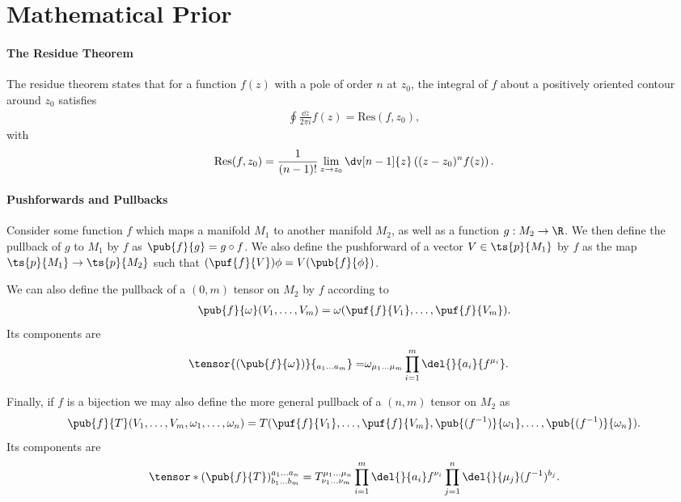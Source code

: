 \section{Mathematical Prior}

\paragraph{The Residue Theorem}
The residue theorem states that for a function $f(z)$ with a pole of order $n$ at $z_{0}$, the integral of $f$ about a positively oriented contour around $z_{0}$ satisfies
\begin{align*}
	\oint\frac{\dd{z}}{2\pi i}f(z) = \text{Res}(f, z_{0}),
\end{align*}
with
\begin{align*}
	\text{Res}(f, z_{0}) = \frac{1}{(n - 1)!}\lim\limits_{z\to z_{0}}\dv[n - 1]{z}\left((z - z_{0})^{n}f(z)\right).
\end{align*}

\paragraph{Pushforwards and Pullbacks}
Consider some function $f$ which maps a manifold $M_{1}$ to another manifold $M_{2}$, as well as a function $g: M_{2}\to\R$. We then define the pullback of $g$ to $M_{1}$ by $f$ as $\pub{f}{g} = g\circ f$. We also define the pushforward of a vector $V\in\ts{p}{M_{1}}$ by $f$ as the map $\ts{p}{M_{1}}\to\ts{p}{M_{2}}$ such that $(\puf{f}{V})\phi = V(\pub{f}{\phi})$.

We can also define the pullback of a $(0, m)$ tensor on $M_{2}$ by $f$ according to
\begin{align*}
	\pub{f}{\omega}(V_{1}, \dots, V_{m}) = \omega(\puf{f}{V_{1}}, \dots, \puf{f}{V_{m}}).
\end{align*}
Its components are
\begin{align*}
	\tensor{(\pub{f}{\omega})}{_{a_{1}\dots a_{m}}} =& \omega_{\mu_{1}\dots\mu_{m}}\prod\limits_{i = 1}^{m}\del{}{a_{i}}{f^{\mu_{i}}}.
\end{align*}

Finally, if $f$ is a bijection we may also define the more general pullback of a $(n, m)$ tensor on $M_{2}$ as
\begin{align*}
	\pub{f}{T}(V_{1}, \dots, V_{m}, \omega_{1}, \dots, \omega_{n}) = T(\puf{f}{V_{1}}, \dots, \puf{f}{V_{m}}, \pub{(f^{-1})}{\omega_{1}}, \dots, \pub{(f^{-1})}{\omega_{n}}).
\end{align*}
Its components are
\begin{align*}
	\tensor*{(\pub{f}{T})}{^{a_{1}\dots a_{n}}_{b_{1}\dots b_{m}}} = T^{\mu_{1}\dots \mu_{n}}_{\nu_{1}\dots\nu_{m}}\prod\limits_{i = 1}^{m}\del{}{a_{i}}f^{\nu_{i}}\prod\limits_{j = 1}^{n}\del{}{\mu_{j}}(f^{-1})^{b_{j}}.
\end{align*}

